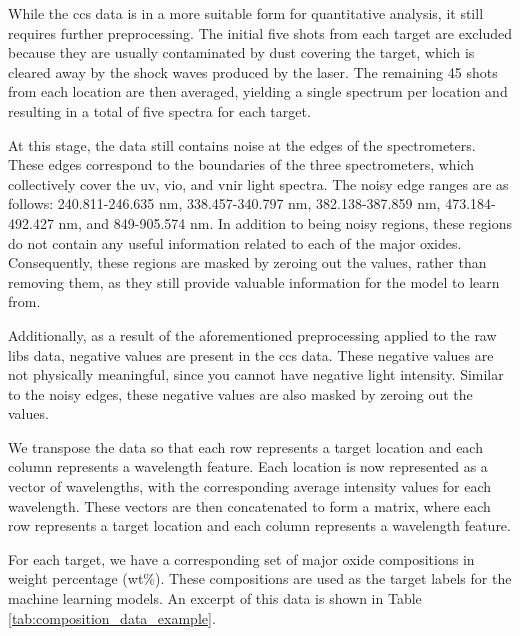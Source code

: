 While the \gls{ccs} data is in a more suitable form for quantitative analysis, it still requires further preprocessing.
The initial five shots from each target are excluded because they are usually contaminated by dust covering the target, which is cleared away by the shock waves produced by the laser.
The remaining 45 shots from each location are then averaged, yielding a single spectrum per location and resulting in a total of five spectra for each target.

At this stage, the data still contains noise at the edges of the spectrometers.
These edges correspond to the boundaries of the three spectrometers, which collectively cover the \gls{uv}, \gls{vio}, and \gls{vnir} light spectra.
The noisy edge ranges are as follows: 240.811-246.635 nm, 338.457-340.797 nm, 382.138-387.859 nm, 473.184-492.427 nm, and 849-905.574 nm.
In addition to being noisy regions, these regions do not contain any useful information related to each of the major oxides.
Consequently, these regions are masked by zeroing out the values, rather than removing them, as they still provide valuable information for the model to learn from\cite{cleggRecalibrationMarsScience2017}.

Additionally, as a result of the aforementioned preprocessing applied to the raw \gls{libs} data, negative values are present in the \gls{ccs} data.
These negative values are not physically meaningful, since you cannot have negative light intensity.
Similar to the noisy edges, these negative values are also masked by zeroing out the values.

We transpose the data so that each row represents a target location and each column represents a wavelength feature.
Each location is now represented as a vector of wavelengths, with the corresponding average intensity values for each wavelength.
These vectors are then concatenated to form a matrix, where each row represents a target location and each column represents a wavelength feature.

For each target, we have a corresponding set of major oxide compositions in weight percentage (wt\%).
These compositions are used as the target labels for the machine learning models.
An excerpt of this data is shown in Table \ref{tab:composition_data_example}.

